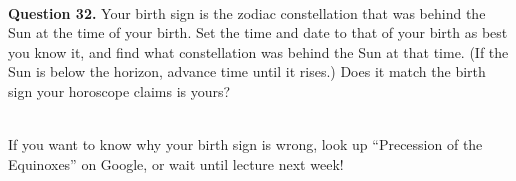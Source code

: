 \documentclass[11pt]{article}
\begin{document}
	\hrulefill\\
	
	\textbf{Question 32.} Your birth sign is the zodiac constellation that was behind the Sun at the time of your birth. Set the time and date to that of your birth as best you know it, and find what constellation was behind the Sun at that time. (If the Sun is below the horizon, advance time until it rises.) Does it match the birth sign your horoscope claims is yours?\\
	\vspace*{1.5cm}
	
	\hrulefill\\
	If you want to know why your birth sign is wrong, look up ``Precession of the Equinoxes'' on Google, or wait until lecture next week!
\end{document}
